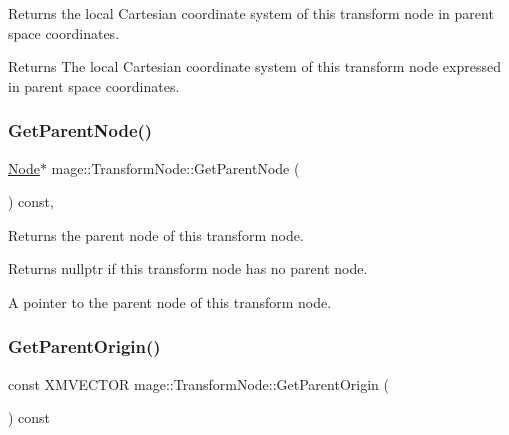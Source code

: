 Returns the local Cartesian coordinate system of this transform node in parent space coordinates.

\begin{DoxyReturn}{Returns}
The local Cartesian coordinate system of this transform node expressed in parent space coordinates. 
\end{DoxyReturn}
\hypertarget{structmage_1_1_transform_node_a63ed2249e0629f0874da5095c0deb705}{}\label{structmage_1_1_transform_node_a63ed2249e0629f0874da5095c0deb705} 
\subsubsection{\texorpdfstring{Get\+Parent\+Node()}{GetParentNode()}}
{\footnotesize\ttfamily \hyperlink{classmage_1_1_node}{Node}$\ast$ mage\+::\+Transform\+Node\+::\+Get\+Parent\+Node (\begin{DoxyParamCaption}{ }\end{DoxyParamCaption}) const\hspace{0.3cm}{\ttfamily [private]}, {\ttfamily [noexcept]}}

Returns the parent node of this transform node.

\begin{DoxyReturn}{Returns}
{\ttfamily nullptr} if this transform node has no parent node. 

A pointer to the parent node of this transform node. 
\end{DoxyReturn}
\hypertarget{structmage_1_1_transform_node_a22a853447eaf646db3522e7f4093ae01}{}\label{structmage_1_1_transform_node_a22a853447eaf646db3522e7f4093ae01} 
\subsubsection{\texorpdfstring{Get\+Parent\+Origin()}{GetParentOrigin()}}
{\footnotesize\ttfamily const X\+M\+V\+E\+C\+T\+OR mage\+::\+Transform\+Node\+::\+Get\+Parent\+Origin (\begin{DoxyParamCaption}{ }\end{DoxyParamCaption}) const\hspace{0.3cm}{\ttfamily [noexcept]}}

